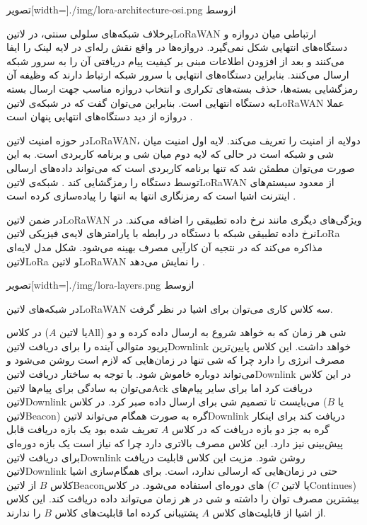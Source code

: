 ‌تصویر[width=\textwidth]{./img/lora-architecture-osi.png}
‌ازوسط

برخلاف شبکه‌های سلولی سنتی، در ‌لاتین{LoRaWAN} ارتباطی میان دروازه و دستگاه‌های انتهایی شکل نمی‌گیرد.
دروازه‌ها در واقع نقش رله‌ای در لایه لینک را ایفا می‌کنند و بعد از افزودن اطلاعات مبنی بر کیفیت پیام دریافتی آن
را به سرور شبکه ارسال می‌کنند. بنابراین دستگاه‌های انتهایی با سرور شبکه ارتباط دارند که وظیفه آن رمزگشایی بسته‌ها، حذف بسته‌های تکراری و
انتخاب دروازه مناسب جهت ارسال بسته به دستگاه انتهایی است.
بنابراین می‌توان گفت که در شبکه‌ی ‌لاتین{LoRaWAN} عملا دروازه از دید دستگاه‌های انتهایی پنهان است
.

در حوزه امنیت ‌لاتین{LoRaWAN}، دولایه از امنیت را تعریف می‌کند. لایه اول امنیت میان شی و شبکه است در حالی که لایه دوم میان شی و برنامه کاربردی است.
به این صورت می‌توان مطمئن شد که تنها برنامه کاربردی است که می‌تواند داده‌های ارسالی توسط دستگاه را رمزگشایی کند
. شبکه‌ی ‌لاتین{LoRaWAN} از معدود سیستم‌های اینترنت اشیا است که رمزنگاری انتها به انتها را پیاده‌سازی کرده است
.

در ضمن ‌لاتین{LoRaWAN} ویژگی‌های دیگری مانند نرخ داده تطبیقی را اضافه می‌کند. در نرخ داده تطبیقی شبکه با دستگاه در رابطه با پارامترهای لایه‌ی فیزیکی ‌لاتین{LoRa} مذاکره می‌کند
که در نتجیه آن کارآیی مصرف بهینه می‌شود. شکل  مدل لایه‌ای ‌لاتین{LoRa} و ‌لاتین{LoRaWAN} را نمایش می‌دهد
.

‌تصویر[width=\textwidth]{./img/lora-layers.png}
‌ازوسط

در شبکه‌های ‌لاتین{LoRaWAN} سه کلاس کاری می‌توان برای اشیا در نظر گرفت.

 در کلاس ($A$ یا ‌لاتین{All}) شی هر زمان که به خواهد شروع به ارسال داده کرده و دو پریود متوالی آینده را برای دریافت ‌لاتین{Downlink} خواهد داشت. این کلاس پایین‌ترین مصرف انرژی را دارد چرا که شی تنها در زمان‌هایی که لازم است
روشن می‌شود و می‌تواند دوباره خاموش شود. با توجه به ساختار دریافت ‌لاتین{Downlink} در این کلاس می‌توان به سادگی برای پیام‌ها ‌لاتین{Ack} دریافت کرد اما برای سایر پیام‌های ‌لاتین{Downlink} می‌بایست تا تصمیم شی برای ارسال داده صبر کرد.
 در کلاس ($B$ یا ‌لاتین{Beacon}) گره به صورت همگام می‌تواند ‌لاتین{Downlink} دریافت کند برای اینکار گره به جز دو بازه دریافت که در کلاس $A$ تعریف شده بود یک بازه دریافت قابل پیش‌بینی نیز دارد.
این کلاس مصرف بالاتری دارد چرا که نیاز است یک بازه دوره‌ای برای دریافت ‌لاتین{Downlink} روشن شود. مزیت این کلاس قابلیت دریافت ‌لاتین{Downlink} حتی در زمان‌هایی که ارسالی ندارد، است. برای همگام‌سازی اشیا کلاس $B$ از ‌لاتین{Beacon}های دوره‌ای استفاده می‌شود.
 در کلاس ($C$ یا ‌لاتین{Continues}) بیشترین مصرف توان را داشته و شی در هر زمان می‌تواند داده دریافت کند. این کلاس از اشیا از قابلیت‌های کلاس $A$ پشتیبانی کرده اما قابلیت‌های کلاس $B$ را ندارند.

